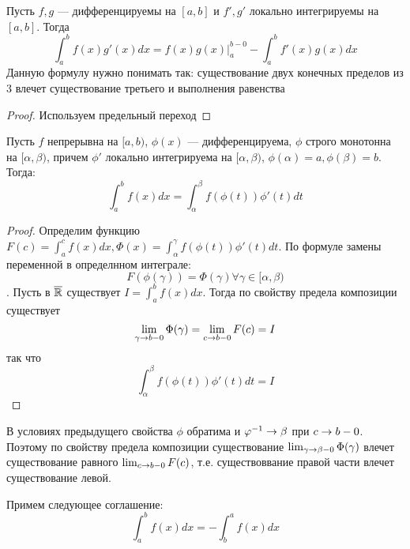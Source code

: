 
\begin{proposition}
    Пусть  \(f, g\) --- дифференцируемы на \([a, b]\) и \(f', g'\) локально интегрируемы на \([a, b]\). Тогда 
    \[\int_{a}^bf(x)g'(x)dx = f(x)g(x)|_a^{b-0} - \int_a^bf'(x)g(x)dx\]
    Данную формулу нужно понимать так: существование двух конечных пределов из 3 влечет существование третьего и выполнения равенства
\end{proposition}
\begin{proof}
    Используем предельный переход
\end{proof}

\begin{proposition}
    Пусть \(f\) непрерывна на \([a, b)\), \(\phi(x)\) --- дифференцируема, \(\phi\) строго монотонна на \([\alpha, \beta)\), причем \(\phi'\) локально интегрируема на \([\alpha, \beta)\), \(\phi(\alpha) = a, \phi(\beta) = b\). Тогда:
    \[\int_a^b f(x)dx = \int_\alpha^\beta f(\phi(t))\phi'(t)dt\]
\end{proposition}
\begin{proof}
    Определим функцию \(F(c) = \int_a^c f(x)dx, \Phi(x) = \int_\alpha^\gamma f(\phi(t))\phi'(t)dt\). По формуле замены переменной в определнном интеграле:
    \[F(\phi(\gamma)) = \Phi(\gamma) \forall \gamma \in [\alpha, \beta)\]. Пусть в \(\overline{\mathbb{R}}\) существует \(I = \int_a^b f(x)dx\). Тогда по свойству предела композиции существует 
    \[\lim_{\gamma\rightarrow b-0}\Phi(\gamma) = \lim_{c \rightarrow b-0}F(c) = I\]
    так что 
    \[\int_\alpha^\beta f(\phi(t))\phi'(t)dt = I\]
\end{proof}

В условиях предыдущего свойства \(\phi\) обратима и \(\varphi^{-1} \rightarrow \beta\) при \(c \rightarrow b - 0\). Поэтому по свойству предела композиции существование \(\lim_{\gamma\rightarrow  \beta - 0}\Phi(\gamma)\) влечет существование равного \(\lim_{c\rightarrow  b - 0}F(c)\), т.е. существоввание правой части влечет существование левой.

\begin{definition}
    Примем следующее соглашение:
    \[\int_a^bf(x)dx = -\int_b^af(x)dx\]
\end{definition}

